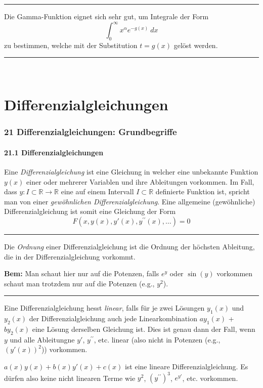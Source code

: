 \documentclass[a4paper,landscape,8pt]{extarticle}
\newcommand{\R}{\mathbb{R}}
\newcommand{\sep}{\vspace{5pt}\noindent\hrule\vspace{5pt}}
\newcommand{\Bem}{\textbf{Bem: }}
\renewcommand*{\newpage}{ \ }
\begin{document}
\begin{multicols*}{4}
\sep

\Vorgehen Die Gamma-Funktion eignet sich sehr gut, um Integrale der Form
\[
\int_0^\infty x^\alpha e^{-g(x)} \ dx
\]
zu bestimmen, welche mit der Substitution $t=g(x)$ gelöst werden.

\sep


\newpage

\part{Differenzialgleichungen}

\section{21 Differenzialgleichungen: Grundbegriffe}


\subsection{21.1 Differenzialgleichungen}

\Def Eine \emph{Differenzialgleichung} ist eine Gleichung in welcher eine
unbekannte Funktion $y(x)$ einer oder mehrerer Variablen und ihre Ableitungen
vorkommen. Im Fall, dass $y\colon I \subset \R \to \R$ eine auf einem Intervall
$I\subset \R$ definierte Funktion ist, spricht man von einer \emph{gewöhnlichen
Differenzialgleichung}. Eine allgemeine (gewöhnliche) Differenzialgleichung ist
somit eine Gleichung der Form
\[
F(x,y(x),y'(x), y^{\prime\prime}(x), \ldots) = 0
\]

\sep

\Def Die \emph{Ordnung} einer Differenzialgleichung ist die Ordnung der höchsten
Ableitung, die in der Differenzialgleichung vorkommt.

\Bem Man schaut hier nur auf die Potenzen, falls $e^y$ oder $\sin(y)$ vorkommen
schaut man trotzdem nur auf die Potenzen (e.g., $y^2$).

\sep

\Def Eine Differenzialgleichung hesst \emph{linear}, falls für je zwei Lösungen
$y_1(x)$ und $y_2(x)$ der Differenzialgleichung auch jede Linearkombination
$ay_1(x)$ + $by_2(x)$ eine Lösung derselben Gleichung ist. Dies ist genau dann
der Fall, wenn $y$ und alle Ableitungne $y'$, $y^{\prime\prime}$, etc. linear
 (also nicht in Potenzen (e.g., $(y'(x))^2$)) vorkommen.
 
\begin{warmup}

\Bsp $a(x)y(x) + b(x)y'(x)+c(x)$ ist eine lineare Differenzialgleichung. Es
dürfen also keine nicht linearen Terme wie $y^2$, $(y^{\prime\prime})^3$,
$e^{y'}$, etc.
vorkommen.


\end{warmup}
\end{multicols*}
\end{document}
